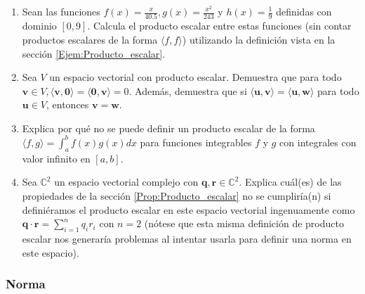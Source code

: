 \documentclass[12pt,dvipsnames]{article}
\begin{document}
\begin{enumerate}
    \item Sean las funciones $f(x)=\frac{x}{40.5}, g(x)=\frac{x^2}{243}$ y $h(x)=\frac{1}{9}$ definidas con dominio $[0,9]$. Calcula el producto escalar entre estas funciones (sin contar productos escalares de la forma $\langle f , f \rangle$) utilizando la definición vista en la sección \ref{Ejem:Producto_escalar}.
    \item Sea $V$ un espacio vectorial con producto escalar. Demuestra que para todo $\mathbf{v}\in V, \langle \mathbf{v},\mathbf{0}\rangle=\langle\mathbf{0},\mathbf{v}\rangle=0.$ Además, demuestra que si $\langle\mathbf{u},\mathbf{v}\rangle=\langle \mathbf{u},\mathbf{w}\rangle$ para todo $\mathbf{u}\in V$, entonces $\mathbf{v}=\mathbf{w}.$
    \item Explica por qué no se puede definir un producto escalar de la forma $\langle f,g\rangle=\int_a^b f(x)g(x)dx$ para funciones integrables $f$ y $g$ con integrales con valor infinito en $[a,b]$. 
    \item Sea $\mathbb{C}^2$ un espacio vectorial complejo con $\mathbf{q},\mathbf{r}\in\mathbb{C}^2$. Explica cuál(es) de las propiedades de la sección \ref{Prop:Producto_escalar} no se cumpliría(n) si definiéramos el producto escalar en este espacio vectorial ingenuamente como $\mathbf{q}\cdot\mathbf{r}=\sum_{i=1}^n q_ir_i$  con $n=2$ (nótese que esta misma definición de producto escalar nos generaría problemas al intentar usarla para definir una norma en este espacio). 
\end{enumerate}

\subsubsection{Norma} \label{Ejer:Norma}
\end{document}
